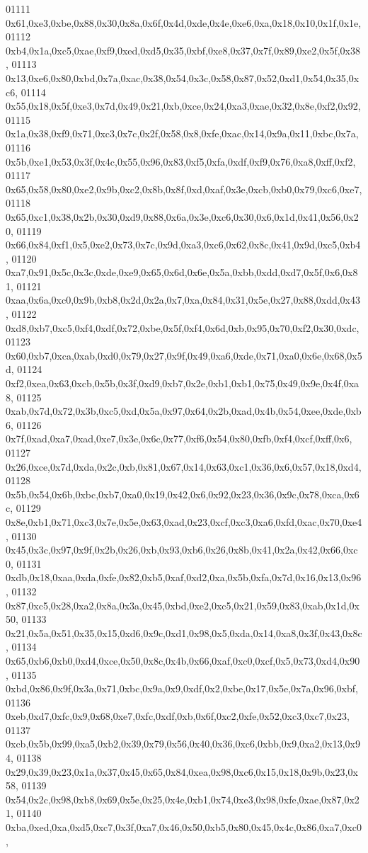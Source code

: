 \begin{DoxyCode}
01111   0x61,0xe3,0xbe,0x88,0x30,0x8a,0x6f,0x4d,0xde,0x4e,0xe6,0xa,0x18,0x10,0x1f,0x1e,
01112   0xb4,0x1a,0xc5,0xae,0xf9,0xed,0xd5,0x35,0xbf,0xe8,0x37,0x7f,0x89,0xe2,0x5f,0x38,
01113   0x13,0xe6,0x80,0xbd,0x7a,0xac,0x38,0x54,0x3c,0x58,0x87,0x52,0xd1,0x54,0x35,0xc6,
01114   0x55,0x18,0x5f,0xe3,0x7d,0x49,0x21,0xb,0xce,0x24,0xa3,0xae,0x32,0x8e,0xf2,0x92,
01115   0x1a,0x38,0xf9,0x71,0xc3,0x7c,0x2f,0x58,0x8,0xfe,0xac,0x14,0x9a,0x11,0xbc,0x7a,
01116   0x5b,0xe1,0x53,0x3f,0x4c,0x55,0x96,0x83,0xf5,0xfa,0xdf,0xf9,0x76,0xa8,0xff,0xf2,
01117   0x65,0x58,0x80,0xe2,0x9b,0xc2,0x8b,0x8f,0xd,0xaf,0x3e,0xcb,0xb0,0x79,0xc6,0xe7,
01118   0x65,0xc1,0x38,0x2b,0x30,0xd9,0x88,0x6a,0x3e,0xc6,0x30,0x6,0x1d,0x41,0x56,0x20,
01119   0x66,0x84,0xf1,0x5,0xe2,0x73,0x7c,0x9d,0xa3,0xc6,0x62,0x8c,0x41,0x9d,0xc5,0xb4,
01120   0xa7,0x91,0x5c,0x3c,0xde,0xe9,0x65,0x6d,0x6e,0x5a,0xbb,0xdd,0xd7,0x5f,0x6,0x81,
01121   0xaa,0x6a,0xc0,0x9b,0xb8,0x2d,0x2a,0x7,0xa,0x84,0x31,0x5e,0x27,0x88,0xdd,0x43,
01122   0xd8,0xb7,0xc5,0xf4,0xdf,0x72,0xbe,0x5f,0xf4,0x6d,0xb,0x95,0x70,0xf2,0x30,0xdc,
01123   0x60,0xb7,0xca,0xab,0xd0,0x79,0x27,0x9f,0x49,0xa6,0xde,0x71,0xa0,0x6e,0x68,0x5d,
01124   0xf2,0xea,0x63,0xcb,0x5b,0x3f,0xd9,0xb7,0x2e,0xb1,0xb1,0x75,0x49,0x9e,0x4f,0xa8,
01125   0xab,0x7d,0x72,0x3b,0xc5,0xd,0x5a,0x97,0x64,0x2b,0xad,0x4b,0x54,0xee,0xde,0xb6,
01126   0x7f,0xad,0xa7,0xad,0xe7,0x3e,0x6c,0x77,0xf6,0x54,0x80,0xfb,0xf4,0xcf,0xff,0x6,
01127   0x26,0xce,0x7d,0xda,0x2c,0xb,0x81,0x67,0x14,0x63,0xc1,0x36,0x6,0x57,0x18,0xd4,
01128   0x5b,0x54,0x6b,0xbc,0xb7,0xa0,0x19,0x42,0x6,0x92,0x23,0x36,0x9c,0x78,0xca,0x6c,
01129   0x8e,0xb1,0x71,0xc3,0x7e,0x5e,0x63,0xad,0x23,0xcf,0xc3,0xa6,0xfd,0xac,0x70,0xe4,
01130   0x45,0x3c,0x97,0x9f,0x2b,0x26,0xb,0x93,0xb6,0x26,0x8b,0x41,0x2a,0x42,0x66,0xc0,
01131   0xdb,0x18,0xaa,0xda,0xfe,0x82,0xb5,0xaf,0xd2,0xa,0x5b,0xfa,0x7d,0x16,0x13,0x96,
01132   0x87,0xc5,0x28,0xa2,0x8a,0x3a,0x45,0xbd,0xe2,0xc5,0x21,0x59,0x83,0xab,0x1d,0x50,
01133   0x21,0x5a,0x51,0x35,0x15,0xd6,0x9c,0xd1,0x98,0x5,0xda,0x14,0xa8,0x3f,0x43,0x8c,
01134   0x65,0xb6,0xb0,0xd4,0xce,0x50,0x8c,0x4b,0x66,0xaf,0xc0,0xcf,0x5,0x73,0xd4,0x90,
01135   0xbd,0x86,0x9f,0x3a,0x71,0xbc,0x9a,0x9,0xdf,0x2,0xbe,0x17,0x5e,0x7a,0x96,0xbf,
01136   0xeb,0xd7,0xfc,0x9,0x68,0xe7,0xfc,0xdf,0xb,0x6f,0xc2,0xfe,0x52,0xc3,0xc7,0x23,
01137   0xcb,0x5b,0x99,0xa5,0xb2,0x39,0x79,0x56,0x40,0x36,0xc6,0xbb,0x9,0xa2,0x13,0x94,
01138   0x29,0x39,0x23,0x1a,0x37,0x45,0x65,0x84,0xea,0x98,0xc6,0x15,0x18,0x9b,0x23,0x58,
01139   0x54,0x2c,0x98,0xb8,0x69,0x5e,0x25,0x4e,0xb1,0x74,0xe3,0x98,0xfe,0xae,0x87,0x21,
01140   0xba,0xed,0xa,0xd5,0xc7,0x3f,0xa7,0x46,0x50,0xb5,0x80,0x45,0x4c,0x86,0xa7,0xc0,

\end{DoxyCode}
